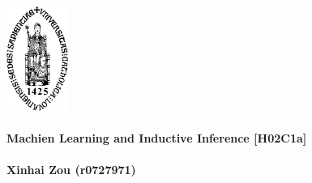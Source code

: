 \begin{titlepage}
    \includegraphics[height=3.4cm]{../others/sedes.pdf}
    \\ \\
    \textbf{Machien Learning and Inductive Inference [H02C1a]}
    \\ \\ 
    \textbf{Xinhai Zou (r0727971)}
\end{titlepage}